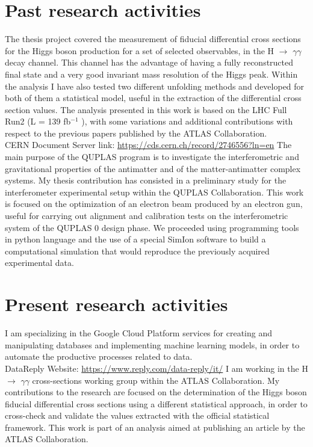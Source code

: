 \documentclass[11pt,a4paper,roman]{moderncv}        %
\begin{document}
\section{Past research activities}
{The thesis project covered the measurement of fiducial differential cross sections for the Higgs boson production for a set of selected observables, in the H $\rightarrow$  $\gamma\gamma$ decay channel. This channel has the advantage of having a fully reconstructed final state and a very good invariant mass resolution of the Higgs peak. Within the analysis I have also tested two different unfolding methods and developed for both of them a statistical model, useful in the extraction of the differential cross section values. The analysis presented in this work is based on the LHC Full Run2 (L = 139 fb$^{-1}$ ), with some variations and additional contributions with respect to the previous papers published by the ATLAS Collaboration. \\
\newline CERN Document Server link: \url{https://cds.cern.ch/record/2746556?ln=en}}
{The main purpose of the QUPLAS program is to investigate the interferometric and gravitational properties of the antimatter and of the matter-antimatter complex systems. My thesis contribution has consisted in a preliminary study for the interferometer experimental setup within the QUPLAS Collaboration. This work is focused on the optimization of an electron beam produced by an electron gun, useful for carrying out alignment and calibration tests on the interferometric system of the QUPLAS 0 design phase. We proceeded using programming tools in python language and the use of a special SimIon software to build a computational simulation that would reproduce the previously acquired experimental data.}

\section{Present research activities}
{I am specializing in the Google Cloud Platform services for creating and manipulating databases and implementing machine learning models, in order to automate the productive processes related to data. \\
DataReply Website: \url{https://www.reply.com/data-reply/it/}}
{I am working in the H $\rightarrow$ $\gamma\gamma$ cross-sections working group within the ATLAS Collaboration. My contributions to the research are focused on the determination of the Higgs boson fiducial differential cross sections using a different statistical approach, in order to cross-check and validate the values extracted with the official statistical framework.
This work is part of an analysis aimed at publishing an article by the ATLAS Collaboration.}
\end{document}
